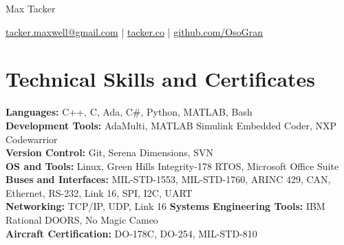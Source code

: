 \documentclass[11pt]{article}       %
\begin{document}
\centerline{\Huge Max Tacker}

\vspace{5pt}

\centerline{\href{mailto:tacker.maxwell@gmail.com}{tacker.maxwell@gmail.com} | \href{https://www.tacker.co/}{tacker.co} | \href{https://www.github.com/OsoGran}{github.com/OsoGran}}

\vspace{-10pt}

\section*{Technical Skills and Certificates}
\textbf{Languages:} C++, C, Ada, C\#, Python, MATLAB, Bash\\
\textbf{Development Tools:} AdaMulti, MATLAB Simulink Embedded Coder, NXP Codewarrior\\
\textbf{Version Control:} Git, Serena Dimensions, SVN\\
\textbf{OS and Tools:} Linux, Green Hills Integrity-178 RTOS, Microsoft Office Suite \\
\textbf{Buses and Interfaces:} MIL-STD-1553, MIL-STD-1760, ARINC 429, CAN, Ethernet, RS-232, Link 16, SPI, I2C, UART\\
\textbf{Networking:} TCP/IP, UDP, Link 16
\textbf{Systems Engineering Tools:} IBM Rational DOORS, No Magic Cameo\\
\textbf{Aircraft Certification:} DO-178C, DO-254, MIL-STD-810\\

\vspace{-6.5pt}

\end{document}
